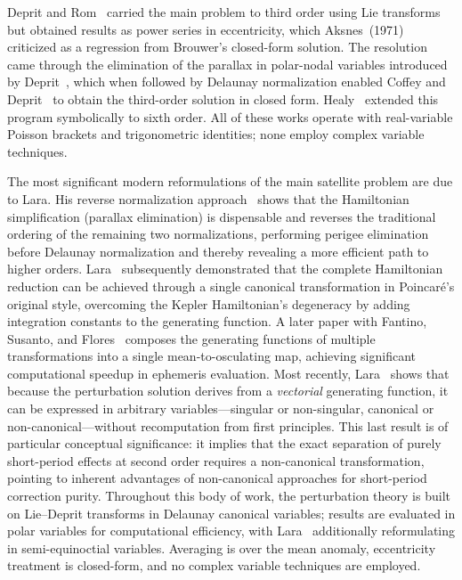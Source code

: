Deprit and Rom~\cite{depritrom1970} carried the main problem to third order
using Lie transforms but obtained results as power series in eccentricity,
which Aksnes~(1971) criticized as a regression from Brouwer's closed-form
solution.  The resolution came through the elimination of the parallax in polar-nodal
variables introduced by Deprit~\cite{deprit1981}, which when followed by
Delaunay normalization enabled Coffey and Deprit~\cite{coffey1982} to
obtain the third-order solution in closed form.  Healy~\cite{healy2000} extended
this program symbolically to sixth order.  All of these works operate with
real-variable Poisson brackets and trigonometric identities; none employ
complex variable techniques.

The most significant modern reformulations of the main satellite problem are
due to Lara.  His reverse normalization approach~\cite{lara2020} shows
that the Hamiltonian simplification (parallax elimination) is dispensable
and reverses the traditional ordering of the remaining two normalizations,
performing perigee elimination before Delaunay normalization and thereby
revealing a more efficient path to higher orders.
Lara~\cite{lara2021} subsequently demonstrated that the complete
Hamiltonian reduction can be achieved through a single canonical
transformation in Poincar\'e's original style, overcoming the Kepler
Hamiltonian's degeneracy by adding integration constants to the generating
function.  A later paper with Fantino, Susanto, and
Flores~\cite{lara2024} composes the generating functions of multiple
transformations into a single mean-to-osculating map, achieving significant
computational speedup in ephemeris evaluation.  Most recently,
Lara~\cite{lara2025} shows that because the perturbation solution derives
from a \emph{vectorial} generating function, it can be expressed in
arbitrary variables---singular or non-singular, canonical or
non-canonical---without recomputation from first principles.  This last
result is of particular conceptual significance: it implies that the exact
separation of purely short-period effects at second order requires a
non-canonical transformation, pointing to inherent advantages of
non-canonical approaches for short-period correction purity.  Throughout this body of work, the perturbation theory is built on
Lie--Deprit transforms in Delaunay canonical variables; results are
evaluated in polar variables for computational efficiency, with
Lara~\cite{lara2025} additionally reformulating in semi-equinoctial
variables.  Averaging is over the mean anomaly, eccentricity treatment
is closed-form, and no complex variable techniques are employed.

